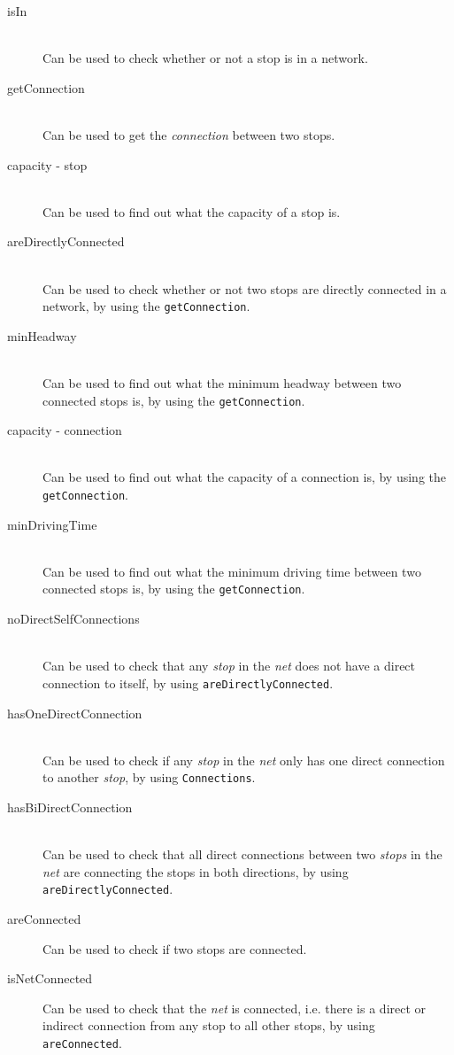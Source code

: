 \documentclass[a4]{article}
\begin{document}
\begin{description}
    \item[isIn] \hfill \\ Can be used to check whether or not a stop is in a network.
    \item[getConnection] \hfill \\ Can be used to get the \emph{connection} between two stops.
    \item[capacity - stop] \hfill \\ Can be used to find out what the capacity of a stop is.
    \item[areDirectlyConnected] \hfill \\ Can be used to check whether or not two stops are directly connected in a network, by using the \verb=getConnection=.
    \item[minHeadway] \hfill \\ Can be used to find out what the minimum headway between two connected stops is, by using the \verb=getConnection=.
    \item[capacity - connection] \hfill \\ Can be used to find out what the capacity of a connection is, by using the \verb=getConnection=.
    \item[minDrivingTime] \hfill \\ Can be used to find out what the minimum driving time between two connected stops is, by using the \verb=getConnection=.
    \item[noDirectSelfConnections] \hfill \\ Can be used to check that any \emph{stop} in the \emph{net} does not have a direct connection to itself, by using \verb=areDirectlyConnected=.
    \item[hasOneDirectConnection] \hfill \\ Can be used to check if any \emph{stop} in the \emph{net} only has one direct connection to another \emph{stop}, by using \verb=Connections=.
    \item[hasBiDirectConnection] \hfill \\ Can be used to check that all direct connections between two \emph{stops} in the \emph{net} are connecting the stops in both directions, by using \verb=areDirectlyConnected=.
    \item[areConnected] Can be used to check if two stops are connected.
    \item[isNetConnected] Can be used to check that the \emph{net} is connected, i.e. there is a direct or indirect connection from any stop to all other stops, by using \verb=areConnected=.

\end{description}
\end{document}
